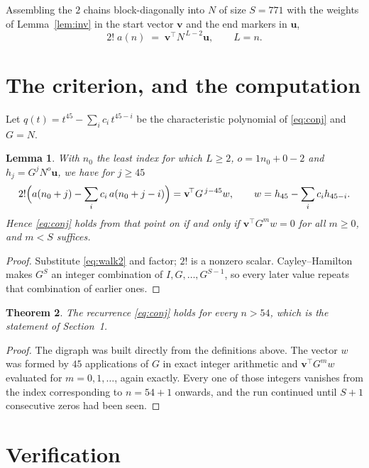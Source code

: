 \documentclass[11pt,a4paper]{article}
\theoremstyle{plain}
\newtheorem{theorem}{Theorem}
\newtheorem{lemma}[theorem]{Lemma}
\theoremstyle{definition}
\begin{document}
Assembling the $2$ chains block-diagonally into $N$ of size $S=771$ with the weights of
Lemma~\ref{lem:inv} in the start vector $\mathbf{v}$ and the end markers in
$\mathbf{u}$,
\begin{equation}\label{eq:walk2}
2!\;a(n)\;=\;\mathbf{v}^{\!\top}N^{\,L-2}\mathbf{u},\qquad L=n .
\end{equation}

\section{The criterion, and the computation}

Let $q(t)=t^{45}-\sum_i c_i\,t^{45-i}$ be the characteristic polynomial of
\eqref{eq:conj} and $G=N$.

\begin{lemma}\label{lem:crit}
With $n_0$ the least index for which $L\ge2$, $o=1n_0+0-2$ and
$h_j=G^{j}N^{o}\mathbf{u}$, we have for $j\ge45$
\[
2!\Bigl(a(n_0+j)-\sum_i c_i\,a(n_0+j-i)\Bigr)=\mathbf{v}^{\!\top}G^{\,j-45}w,
\qquad w=h_{45}-\sum_i c_i h_{45-i} .
\]
Hence \eqref{eq:conj} holds from that point on if and only if
$\mathbf{v}^{\!\top}G^{m}w=0$ for all $m\ge0$, and $m<S$ suffices.
\end{lemma}

\begin{proof}
Substitute \eqref{eq:walk2} and factor; $2!$ is a nonzero scalar. Cayley--Hamilton
makes $G^{S}$ an integer combination of $I,G,\dots,G^{S-1}$, so every later value repeats
that combination of earlier ones.
\end{proof}

\begin{theorem}
The recurrence \eqref{eq:conj} holds for every $n>54$, which is the statement of
Section~1.
\end{theorem}

\begin{proof}
The digraph was built directly from the definitions above. The vector $w$ was formed by
$45$ applications of $G$ in exact integer arithmetic and $\mathbf{v}^{\!\top}G^{m}w$
evaluated for $m=0,1,\dots$, again exactly. Every one of those integers vanishes from the
index corresponding to $n=54+1$ onwards, and the run continued until $S+1$ consecutive
zeros had been seen.
\end{proof}

\section{Verification}
\end{document}

